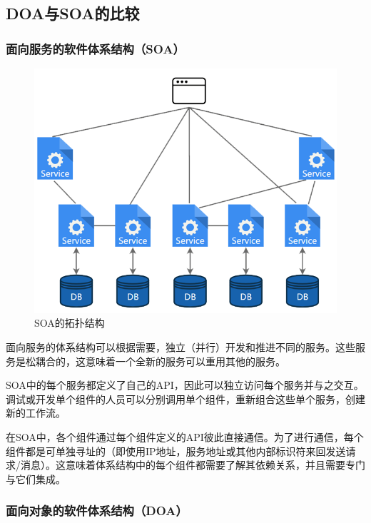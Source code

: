 \documentclass[article]{BJTU-thesis}
\begin{document}
	\subsection{DOA与SOA的比较}
	\subsubsection{面向服务的软件体系结构（SOA）}
	
	\begin{figure}[!htbp]
		\centering
		\includegraphics[scale=0.8]{3.png}
		\caption{SOA的拓扑结构}
		\label{fig:fig3}
	\end{figure}
	
	面向服务的体系结构可以根据需要，独立（并行）开发和推进不同的服务。这些服务是松耦合的，这意味着一个全新的服务可以重用其他的服务。
	
	SOA中的每个服务都定义了自己的API，因此可以独立访问每个服务并与之交互。调试或开发单个组件的人员可以分别调用单个组件，重新组合这些单个服务，创建新的工作流。
	
	在SOA中，各个组件通过每个组件定义的API彼此直接通信。为了进行通信，每个组件都是可单独寻址的（即使用IP地址，服务地址或其他内部标识符来回发送请求/消息）。这意味着体系结构中的每个组件都需要了解其依赖关系，并且需要专门与它们集成。
	
	\subsubsection{面向对象的软件体系结构（DOA）}
	
\end{document}
